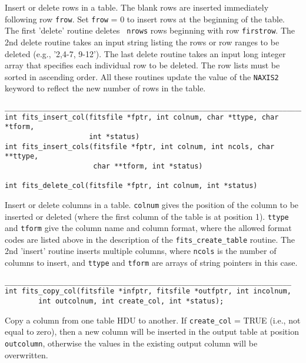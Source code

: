 \documentclass[11pt]{article}
\begin{document}
Insert or delete rows in a table.  The blank rows are inserted
immediately following row {\tt frow}. Set {\tt frow} = 0 to insert rows
at the beginning of the table.  The first 'delete' routine deletes {\tt
nrows} rows beginning with row {\tt firstrow}.   The 2nd delete routine
takes an input string listing the rows or row ranges to be deleted
(e.g., '2,4-7, 9-12').  The last delete routine takes an input long
integer array that specifies each individual row to be deleted.  The
row lists must be sorted in ascending order.  All these routines update
the value of the {\tt NAXIS2} keyword to reflect the new number of rows
in the table.

\begin{verbatim}
_________________________________________________________________________
int fits_insert_col(fitsfile *fptr, int colnum, char *ttype, char *tform,
                    int *status)
int fits_insert_cols(fitsfile *fptr, int colnum, int ncols, char **ttype,
                     char **tform, int *status)

int fits_delete_col(fitsfile *fptr, int colnum, int *status)
\end{verbatim}

Insert or delete columns in a table.  {\tt colnum} gives the position
of the column to be inserted or deleted (where the first column of the
table is at position 1).  {\tt ttype} and {\tt tform} give the column
name and column format, where the allowed format codes are listed above
in the description of the {\tt fits\_create\_table} routine.  The 2nd
'insert' routine inserts multiple columns, where {\tt ncols} is the
number of columns to insert, and  {\tt ttype} and {\tt tform} are
arrays of string pointers in this case.

\begin{verbatim}
____________________________________________________________________
int fits_copy_col(fitsfile *infptr, fitsfile *outfptr, int incolnum,
        int outcolnum, int create_col, int *status);
\end{verbatim}

Copy a column from one table HDU to another.  If {\tt create\_col} = TRUE (i.e., not equal to zero),
then a new column will be inserted in the output table at position
{\tt outcolumn}, otherwise the values in the existing output column will be
overwritten. 
\end{document}

